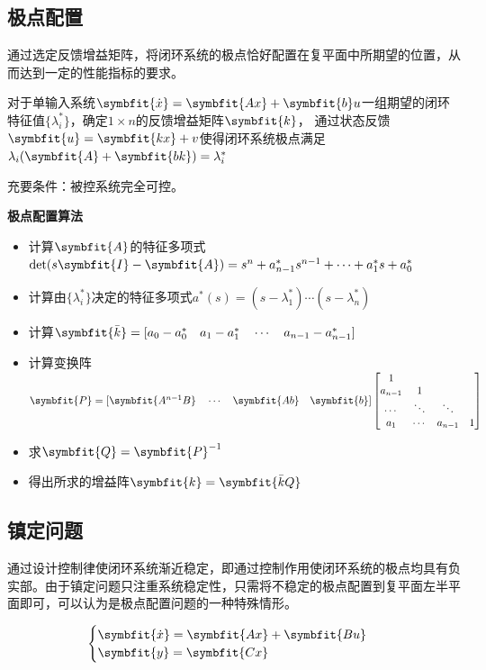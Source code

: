 \documentclass[11pt,a4paper]{ctexart}
\newcommand{\bm}{\symbfit}
\begin{document}
    \subsection{极点配置}
        通过选定反馈增益矩阵，将闭环系统的极点恰好配置在复平面中所期望的位置，从而达到一定的性能指标的要求。
        
        对于单输入系统$\bm{\dot x}=\bm{Ax}+\bm{b}u$一组期望的闭环特征值$\{\lambda^*_i\}$，确定$1\times n$的反馈增益矩阵$\bm{k}$，
        通过状态反馈$\bm{u}=\bm{kx}+v$使得闭环系统极点满足$\lambda_i(\bm{A}+\bm{bk})=\lambda_i^*$

        充要条件：被控系统完全可控。

        {\setlength{\parindent}{0pt}\textbf{极点配置算法}}

        \begin{itemize}[label=\protect{}]
            \item 计算$\bm{A}$的特征多项式$\det(s\bm{I}-\bm{A})=s^n+a^*_{n-1}s^{n-1}+\cdots+a_1^*s+a_0^*$
            \item 计算由$\{\lambda^*_i\}$决定的特征多项式$a^*(s)=(s-\lambda^*_1)\cdots(s-\lambda^*_n)$
            \item 计算$\bm{\bar k}=[a_0-a_0^*\quad a_1-a_1^*\quad\cdots\quad a_{n-1}-a_{n-1}^*]$
            \item 计算变换阵$\bm{P}=[\bm{A^{n-1}B}\quad\cdots\quad\bm{Ab}\quad\bm{b}]\begin{bmatrix}1&\\a_{n-1}& 1 \\ \cdots &\ddots & \ddots \\a_1 & \cdots & a_{n-1} & 1\end{bmatrix}$
            \item 求$\bm{Q}=\bm{P}^{-1}$
            \item 得出所求的增益阵$\bm{k}=\bm{\bar k Q}$
            \end{itemize}
        \subsection{镇定问题}
        通过设计控制律使闭环系统渐近稳定，即通过控制作用使闭环系统的极点均具有负实部。由于镇定问题只注重系统稳定性，只需将不稳定的极点配置到复平面左半平面即可，可以认为是极点配置问题的一种特殊情形。

        \[
        \begin{cases}
        \bm{\dot{x}}=\bm{Ax}+\bm{Bu}\\
        \bm{y}=\bm{Cx}
        \end{cases}
        \]
\end{document}
